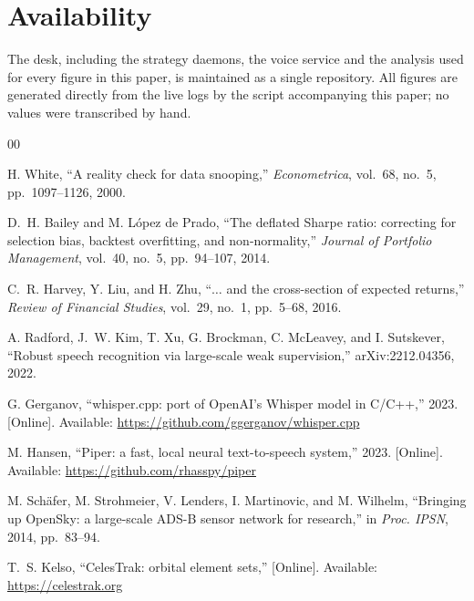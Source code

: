 \documentclass[conference]{IEEEtran}
\begin{document}
\section*{Availability}

The desk, including the strategy daemons, the voice service and the analysis
used for every figure in this paper, is maintained as a single repository. All
figures are generated directly from the live logs by the script accompanying
this paper; no values were transcribed by hand.

\begin{thebibliography}{00}

 H. White, ``A reality check for data snooping,''
\emph{Econometrica}, vol.~68, no.~5, pp.~1097--1126, 2000.

 D.~H. Bailey and M. L\'{o}pez de Prado, ``The deflated
Sharpe ratio: correcting for selection bias, backtest overfitting, and
non-normality,'' \emph{Journal of Portfolio Management}, vol.~40, no.~5,
pp.~94--107, 2014.

 C.~R. Harvey, Y. Liu, and H. Zhu, ``$\ldots$ and the
cross-section of expected returns,'' \emph{Review of Financial Studies},
vol.~29, no.~1, pp.~5--68, 2016.

 A. Radford, J.~W. Kim, T. Xu, G. Brockman, C. McLeavey,
and I. Sutskever, ``Robust speech recognition via large-scale weak
supervision,'' arXiv:2212.04356, 2022.

 G. Gerganov, ``whisper.cpp: port of OpenAI's Whisper model
in C/C++,'' 2023. [Online]. Available:
\url{https://github.com/ggerganov/whisper.cpp}

 M. Hansen, ``Piper: a fast, local neural text-to-speech
system,'' 2023. [Online]. Available:
\url{https://github.com/rhasspy/piper}

 M. Sch\"{a}fer, M. Strohmeier, V. Lenders, I. Martinovic, and
M. Wilhelm, ``Bringing up OpenSky: a large-scale ADS-B sensor network for
research,'' in \emph{Proc. IPSN}, 2014, pp.~83--94.

 T.~S. Kelso, ``CelesTrak: orbital element sets,'' [Online].
Available: \url{https://celestrak.org}

\end{thebibliography}
\end{document}
